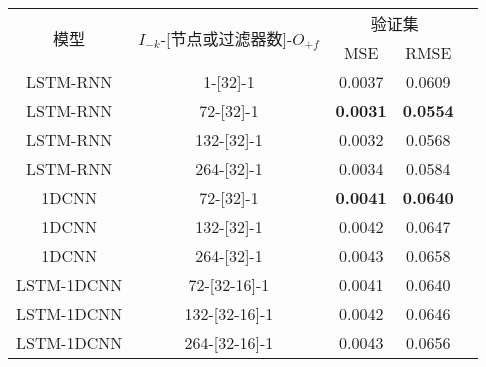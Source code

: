 \begin{table}[!htbp]
    \centering
    \label{tab:ss_number_out_72}
    \footnotesize
    \renewcommand{\arraystretch}{1}
    \begin{tabular}{ccccc}
    \toprule
    \multirow{2}{*}{模型} & \multirow{2}{*}{$I_{-k}$-[节点或过滤器数]-$O_{+f}$} & \multicolumn{2}{c}{验证集}\\
    \cmidrule(lr){3-4}
    \noalign{\smallskip}
    & & MSE & RMSE\\
    \midrule 
    LSTM-RNN & 1-[32]-1 & 0.0037 & 0.0609 \\
    LSTM-RNN & 72-[32]-1 & \textbf{0.0031} & \textbf{0.0554} \\
    LSTM-RNN & 132-[32]-1 & 0.0032 & 0.0568 \\
    LSTM-RNN & 264-[32]-1 & 0.0034 & 0.0584 \\
    \hline
    1DCNN & 72-[32]-1 & \textbf{0.0041} & \textbf{0.0640} \\
    1DCNN & 132-[32]-1 & 0.0042 & 0.0647 \\
    1DCNN & 264-[32]-1 & 0.0043 & 0.0658 \\
    \hline
    LSTM-1DCNN & 72-[32-16]-1 & 0.0041 & 0.0640 \\
    LSTM-1DCNN & 132-[32-16]-1 & 0.0042 & 0.0646 \\
    LSTM-1DCNN & 264-[32-16]-1 & 0.0043 & 0.0656 \\
    \bottomrule
    \end{tabular}
\end{table}


